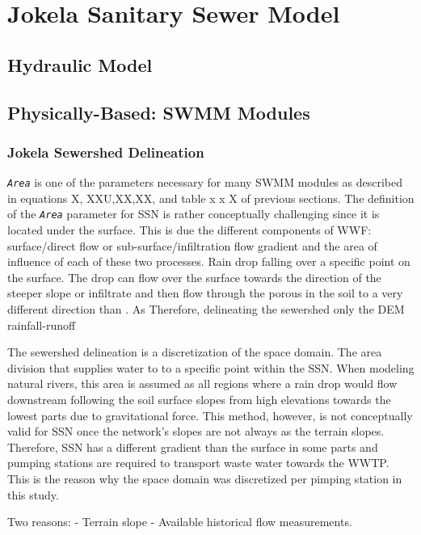 \section{Jokela Sanitary Sewer Model}

    \subsection{Hydraulic Model}
    
    \subsection{Physically-Based: SWMM Modules}


        \subsubsection{Jokela Sewershed Delineation}

\texttt{\textit{Area}} is one of the parameters necessary for many SWMM modules as described in equations X, XXU,XX,XX, and table x x X of previous sections. The definition of the \texttt{\textit{Area}} parameter for \acf{SSN} is rather conceptually challenging since it is located under the surface. This is due the different components of \ac{WWF}: surface/direct flow or sub-surface/infiltration flow gradient and the area of influence of each of these two processes. Rain drop falling over a specific point on the surface. The drop can flow over the surface towards the direction of the steeper slope or infiltrate and then flow through the porous in the soil to a very different direction than . As 
Therefore, delineating the sewershed only the \acf{DEM} rainfall-runoff

The sewershed delineation is a discretization of the space domain. The area division that supplies water to to a specific point within the \ac{SSN}. When modeling natural rivers, this area is assumed as all regions where a rain drop would flow downstream following the soil surface slopes from high elevations towards the lowest parts due to gravitational force. This method, however, is not conceptually valid for \ac{SSN} once the network's slopes are not always as the terrain slopes. Therefore, \ac{SSN} has a different gradient than the surface in some parts and pumping stations are required to transport waste water towards the \acf{WWTP}. This is the reason why the space domain was discretized per pimping station in this study.


Two reasons:
- Terrain slope
- Available historical flow measurements.

